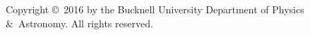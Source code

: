 \mbox{}
\vspace{7in}

\noindent
Copyright \copyright\ 2016 by the Bucknell University Department of
Physics \&\ Astronomy.
All rights reserved. 
